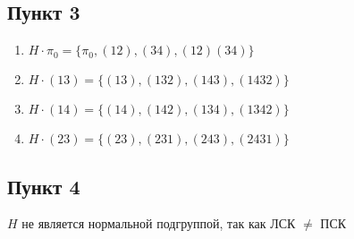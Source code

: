 \documentclass{article}
\begin{document}
\subsection*{Пункт 3}
\begin{enumerate}
    \item $H \cdot \pi_0 = \{\pi_0, (12) , (34) , (12)(34)\}$
    \item $H \cdot (13)  = \{(13) , (132), (143), (1432)  \}$
    \item $H \cdot (14)  = \{(14) , (142), (134), (1342)  \}$
    \item $H \cdot (23)  = \{(23) , (231), (243), (2431)  \}$
\end{enumerate}

\subsection*{Пункт 4}
$H$ не является нормальной подгруппой, так как ЛСК $\ne$ ПСК
\end{document}
